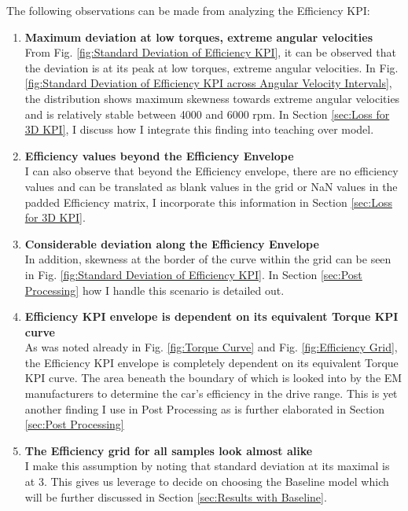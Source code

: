 \documentclass{report} %
\begin{document}
The following observations can be made from analyzing the Efficiency \ac{KPI}:
\begin{enumerate}[nosep]
    \item \textbf{Maximum deviation at low torques, extreme angular velocities}\\
    From Fig. \ref{fig:Standard Deviation of Efficiency KPI}, it can be observed that the deviation is at its peak at low torques, extreme angular velocities. 
    In Fig. \ref{fig:Standard Deviation of Efficiency KPI across Angular Velocity Intervals}, the distribution shows maximum skewness towards 
    extreme angular velocities and is relatively stable between 4000 and 6000 rpm. 
    In Section \ref{sec:Loss for 3D KPI}, I discuss how I integrate this finding into teaching over model. 
    \item \textbf{Efficiency values beyond the Efficiency Envelope}\\
    I can also observe that beyond the Efficiency envelope, there are no efficiency values and can be translated as blank values in the grid or \ac{NaN} values 
    in the padded Efficiency matrix, I incorporate this information in Section \ref{sec:Loss for 3D KPI}.
    \item \textbf{Considerable deviation along the Efficiency Envelope}\\
    In addition, skewness at the border of the curve within the grid can be seen in Fig. \ref{fig:Standard Deviation of Efficiency KPI}.
    In Section \ref{sec:Post Processing} how I handle this scenario is detailed out.
    \item \textbf{Efficiency \ac{KPI} envelope is dependent on its equivalent Torque \ac{KPI} curve}\\
    As was noted already in Fig. \ref{fig:Torque Curve} and Fig. \ref{fig:Efficiency Grid}, the Efficiency \ac{KPI} envelope is completely dependent on its equivalent 
    Torque \ac{KPI} curve. The area beneath the boundary of which is looked into by the \ac{EM} manufacturers to determine the car's efficiency in the drive range.
    This is yet another finding I use in Post Processing as is further elaborated in Section \ref{sec:Post Processing}
    \item \textbf{The Efficiency grid for all samples look almost alike} \\
    I make this assumption by noting that standard deviation at its maximal is at 3. This gives us leverage to decide on choosing the Baseline model which will 
    be further discussed in Section \ref{sec:Results with Baseline}.

\end{enumerate}
\end{document}

